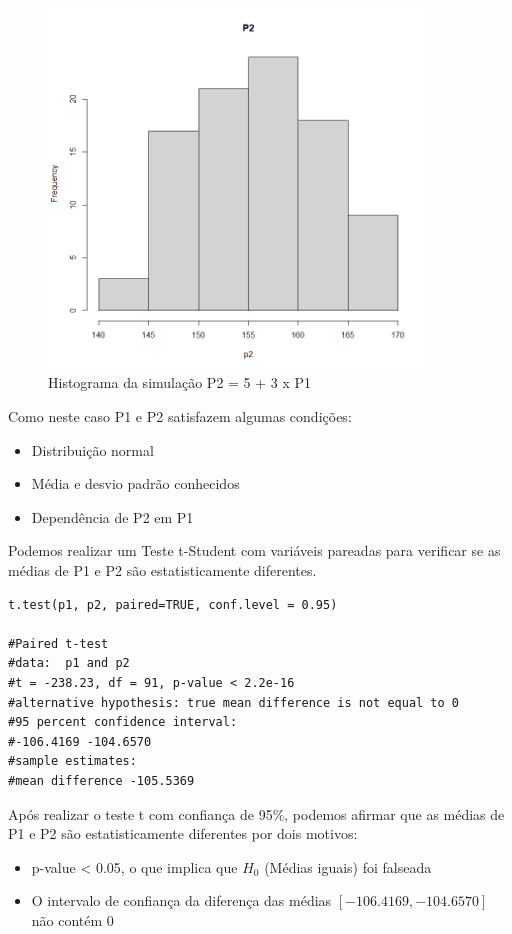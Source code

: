 \documentclass{article}
\begin{document}
\begin{figure}[h] %
    \centering
    \includegraphics[width=0.9\textwidth]{figures/p2.png} %
    \caption{Histograma da simulação P2 = 5 + 3 x P1}
    \label{fig2}
\end{figure}

Como neste caso P1 e P2 satisfazem algumas condições:

\begin{itemize}
    \item Distribuição normal
    \item Média e desvio padrão conhecidos
    \item Dependência de P2 em P1
\end{itemize}

Podemos realizar um Teste t-Student com variáveis pareadas para verificar se as médias de P1 e P2 são estatisticamente diferentes. 

\begin{lstlisting}
t.test(p1, p2, paired=TRUE, conf.level = 0.95)

#Paired t-test
#data:  p1 and p2
#t = -238.23, df = 91, p-value < 2.2e-16
#alternative hypothesis: true mean difference is not equal to 0
#95 percent confidence interval:
#-106.4169 -104.6570
#sample estimates:
#mean difference -105.5369
\end{lstlisting}

Após realizar o teste t com confiança de 95\%, podemos afirmar que as médias de P1 e P2 são estatisticamente diferentes por dois motivos:
\begin{itemize}
    \item p-value < 0.05, o que implica que $H_0$ (Médias iguais) foi falseada
    \item O intervalo de confiança da diferença das médias $[-106.4169, -104.6570]$ não contém $0$
\end{itemize}
\end{document}
